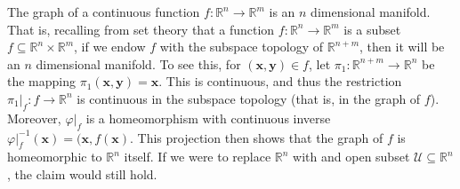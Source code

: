         \begin{example}
            The graph of a continuous function
            $f:\mathbb{R}^{n}\rightarrow\mathbb{R}^{m}$ is an $n$ dimensional
            manifold. That is, recalling from set theory that a function
            $f:\mathbb{R}^{n}\rightarrow\mathbb{R}^{m}$ is a subset
            $f\subseteq\mathbb{R}^{n}\times\mathbb{R}^{m}$, if we endow $f$ with
            the subspace topology of $\mathbb{R}^{n+m}$, then it will be an
            $n$ dimensional manifold. To see this, for
            $(\mathbf{x},\mathbf{y})\in{f}$, let
            $\pi_{1}:\mathbb{R}^{n+m}\rightarrow\mathbb{R}^{n}$ be the mapping
            $\pi_{1}(\mathbf{x},\mathbf{y})=\mathbf{x}$. This is continuous, and
            thus the restriction $\pi_{1}|_{f}:f\rightarrow\mathbb{R}^{n}$ is
            continuous in the subspace topology (that is, in the graph of $f$).
            Moreover, $\varphi|_{f}$ is a homeomorphism with continuous inverse
            $\varphi|_{f}^{\minus{1}}(\mathbf{x})=(\mathbf{x},f(\mathbf{x})$.
            This projection then shows that the graph of $f$ is homeomorphic to
            $\mathbb{R}^{n}$ itself. If we were to replace $\mathbb{R}^{n}$ with
            and open subset $\mathcal{U}\subseteq\mathbb{R}^{n}$, the claim
            would still hold.
        \end{example}
